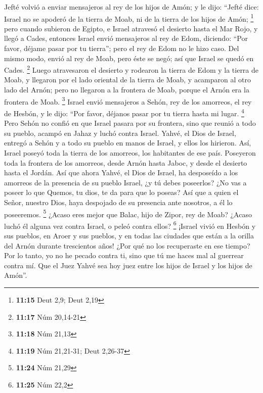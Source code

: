  Jefté volvió a enviar mensajeros al rey de los hijos de
Amón;  y le dijo: ``Jefté dice: Israel no se apoderó de
la tierra de Moab, ni de la tierra de los hijos de Amón; \footnote{\textbf{11:15}
  Deut 2,9; Deut 2,19}  pero cuando subieron de Egipto, e
Israel atravesó el desierto hasta el Mar Rojo, y llegó a Cades,
 entonces Israel envió mensajeros al rey de Edom,
diciendo: ``Por favor, déjame pasar por tu tierra''; pero el rey de Edom
no le hizo caso. Del mismo modo, envió al rey de Moab, pero éste se
negó; así que Israel se quedó en Cades. \footnote{\textbf{11:17} Núm
  20,14-21}  Luego atravesaron el desierto y rodearon la
tierra de Edom y la tierra de Moab, y llegaron por el lado oriental de
la tierra de Moab, y acamparon al otro lado del Arnón; pero no llegaron
a la frontera de Moab, porque el Arnón era la frontera de Moab.
\footnote{\textbf{11:18} Núm 21,13}  Israel envió
mensajeros a Sehón, rey de los amorreos, el rey de Hesbón, y le dijo:
``Por favor, déjanos pasar por tu tierra hasta mi lugar. \footnote{\textbf{11:19}
  Núm 21,21-31; Deut 2,26-37}  Pero Sehón no confió en
que Israel pasara por su frontera, sino que reunió a todo su pueblo,
acampó en Jahaz y luchó contra Israel.  Yahvé, el Dios de
Israel, entregó a Sehón y a todo su pueblo en manos de Israel, y ellos
los hirieron. Así, Israel poseyó toda la tierra de los amorreos, los
habitantes de ese país.  Poseyeron toda la frontera de
los amorreos, desde Arnón hasta Jaboc, y desde el desierto hasta el
Jordán.  Así que ahora Yahvé, el Dios de Israel, ha
desposeído a los amorreos de la presencia de su pueblo Israel, ¿y tú
debes poseerlos?  ¿No vas a poseer lo que Quemos, tu
dios, te da para que lo poseas? Así que a quien el Señor, nuestro Dios,
haya despojado de su presencia ante nosotros, a él lo poseeremos.
\footnote{\textbf{11:24} Núm 21,29}  ¿Acaso eres mejor
que Balac, hijo de Zipor, rey de Moab? ¿Acaso luchó él alguna vez contra
Israel, o peleó contra ellos? \footnote{\textbf{11:25} Núm 22,2}
 ¡Israel vivió en Hesbón y sus pueblos, en Aroer y sus
pueblos, y en todas las ciudades que están a la orilla del Arnón durante
trescientos años! ¿Por qué no los recuperaste en ese tiempo?
 Por lo tanto, yo no he pecado contra ti, sino que tú me
haces mal al guerrear contra mí. Que el Juez Yahvé sea hoy juez entre
los hijos de Israel y los hijos de Amón''.

